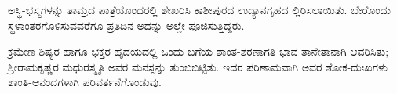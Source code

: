 ಅಸ್ಥಿ-ಭಸ್ಮಗಳನ್ನು ತಾಮ್ರದ ಪಾತ್ರೆಯೊಂದರಲ್ಲಿ ಶೇಖರಿಸಿ ಕಾಶೀಪುರದ ಉದ್ಯಾನಗೃಹದ ಲ್ಲಿರಿಸಲಾಯಿತು. ಬೇರೊಂದು ಸ್ಥಳಾಂತರಗೊಳಿಸುವವರೆಗೂ ಪ್ರತಿದಿನ ಅದನ್ನು ಅಲ್ಲೇ ಪೂಜಿಸುತ್ತಿದ್ದರು. 

ಕ್ರಮೇಣ ಶಿಷ್ಯರ ಹಾಗೂ ಭಕ್ತರ ಹೃದಯದಲ್ಲಿ ಒಂದು ಬಗೆಯ ಶಾಂತ-ಶರಣಾಗತಿ ಭಾವ ತಾನೇತಾನಾಗಿ ಆವರಿಸಿತು; ಶ್ರೀರಾಮಕೃಷ್ಣರ ಮಧುರಸ್ಮೃತಿ ಅವರ ಮನಸ್ಸನ್ನು ತುಂಬಿಬಿಟ್ಟಿತು. ಇದರ ಪರಿಣಾಮವಾಗಿ ಅವರ ಶೋಕ-ದುಃಖಗಳು ಶಾಂತಿ-ಆನಂದಗಳಾಗಿ ಪರಿವರ್ತನೆಗೊಂಡುವು.

